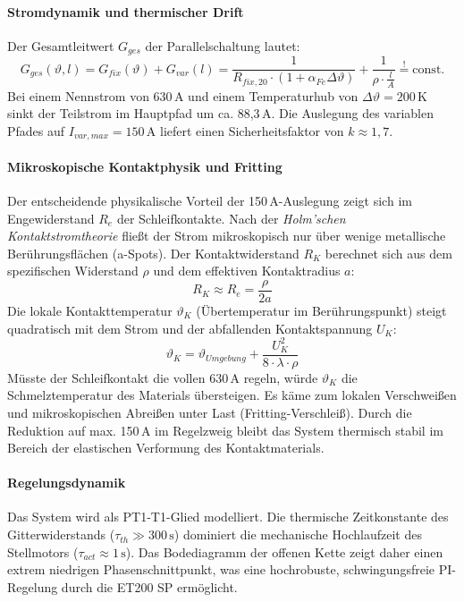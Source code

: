 \paragraph{Stromdynamik und thermischer Drift}
Der Gesamtleitwert $G_{ges}$ der Parallelschaltung lautet:
\begin{equation}
    G_{ges}(\vartheta, l) = G_{fix}(\vartheta) + G_{var}(l) = \frac{1}{R_{fix,20} \cdot (1 + \alpha_{Fe} \Delta\vartheta)} + \frac{1}{\rho \cdot \frac{l}{A}} \stackrel{!}{=} \text{const.}
\end{equation}
Bei einem Nennstrom von 630\,A und einem Temperaturhub von $\Delta\vartheta = 200\,\text{K}$ sinkt der Teilstrom im Hauptpfad um ca. 88,3\,A. Die Auslegung des variablen Pfades auf $I_{var,max} = 150\,\text{A}$ liefert einen Sicherheitsfaktor von $k \approx 1,7$.

\paragraph{Mikroskopische Kontaktphysik und Fritting}
Der entscheidende physikalische Vorteil der 150\,A-Auslegung zeigt sich im Engewiderstand $R_e$ der Schleifkontakte. Nach der \textit{Holm'schen Kontaktstromtheorie} fließt der Strom mikroskopisch nur über wenige metallische Berührungsflächen (a-Spots). Der Kontaktwiderstand $R_K$ berechnet sich aus dem spezifischen Widerstand $\rho$ und dem effektiven Kontaktradius $a$:
\begin{equation}
    R_K \approx R_e = \frac{\rho}{2a}
\end{equation}
Die lokale Kontakttemperatur $\vartheta_K$ (Übertemperatur im Berührungspunkt) steigt quadratisch mit dem Strom und der abfallenden Kontaktspannung $U_K$:
\begin{equation}
    \vartheta_K = \vartheta_{Umgebung} + \frac{U_K^2}{8 \cdot \lambda \cdot \rho}
\end{equation}
Müsste der Schleifkontakt die vollen 630\,A regeln, würde $\vartheta_K$ die Schmelztemperatur des Materials übersteigen. Es käme zum lokalen Verschweißen und mikroskopischen Abreißen unter Last (Fritting-Verschleiß). Durch die Reduktion auf max. 150\,A im Regelzweig bleibt das System thermisch stabil im Bereich der elastischen Verformung des Kontaktmaterials.

\paragraph{Regelungsdynamik}
Das System wird als PT1-T1-Glied modelliert. Die thermische Zeitkonstante des Gitterwiderstands ($\tau_{th} \gg 300\,\text{s}$) dominiert die mechanische Hochlaufzeit des Stellmotors ($\tau_{act} \approx 1\,\text{s}$). Das Bodediagramm der offenen Kette zeigt daher einen extrem niedrigen Phasenschnittpunkt, was eine hochrobuste, schwingungsfreie PI-Regelung durch die ET200 SP ermöglicht.


